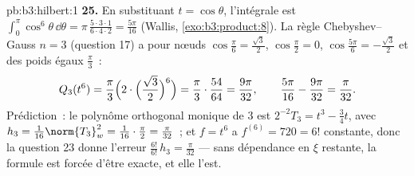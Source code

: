 \begin{solution}{pb:b3:hilbert:1}
\textbf{25.} En substituant $t = \cos\theta$, l'intégrale est
$\int_0^\pi\cos^6\theta\,\dd\theta =
\pi\,\frac{5\cdot3\cdot1}{6\cdot4\cdot2} = \frac{5\pi}{16}$
(Wallis, \cref{exo:b3:product:8}). La règle
Chebyshev--Gauss $n = 3$ (question 17) a pour nœuds
$\cos\frac\pi6 = \frac{\sqrt3}2$, $\cos\frac\pi2 = 0$,
$\cos\frac{5\pi}6 = -\frac{\sqrt3}2$ et des poids égaux
$\frac\pi3$~:
\[
Q_3(t^6) = \frac\pi3\Bigl(2\cdot\Bigl(\frac{\sqrt3}2
\Bigr)^{6}\Bigr) = \frac\pi3\cdot\frac{54}{64}
= \frac{9\pi}{32},
\qquad
\frac{5\pi}{16} - \frac{9\pi}{32} = \frac\pi{32} .
\]
Prédiction~: le polynôme orthogonal monique de  $3$ est
$2^{-2}T_3 = t^3 - \frac34t$, avec $h_3 =
\frac1{16}\norm{T_3}_w^2 = \frac1{16}\cdot\frac\pi2 =
\frac\pi{32}$~; et $f = t^6$ a $f^{(6)} = 720 = 6!$
constante, donc la question 23 donne l'erreur
$\frac{6!}{6!}\,h_3 = \frac\pi{32}$ --- sans dépendance en
$\xi$ restante, la formule est forcée d'être exacte, et elle
l'est.
\end{solution}
